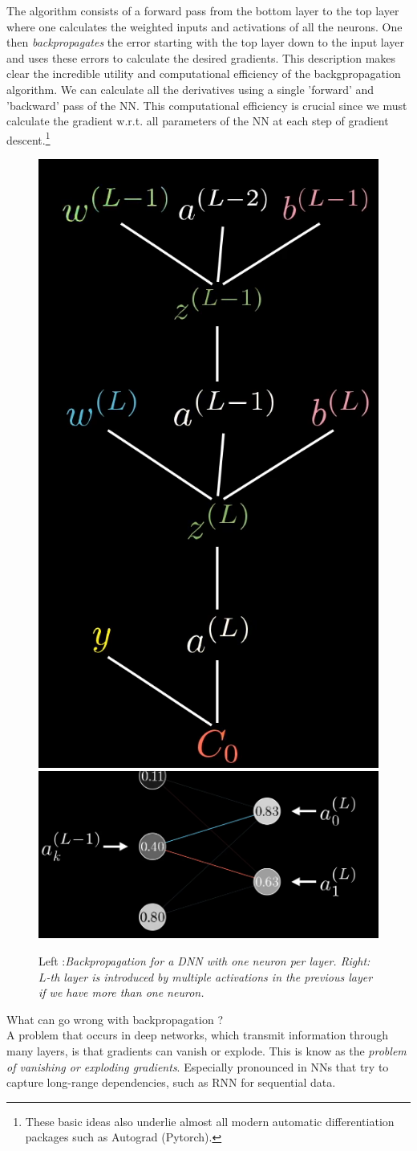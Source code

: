 The algorithm consists of a forward pass from the bottom layer to the top layer where one calculates the weighted inputs and activations of all the neurons. One then \emph{backpropagates} the error starting with the top layer down to the input layer and uses these errors to calculate the desired gradients. This description makes clear the incredible utility and computational efficiency of the backgpropagation algorithm. We can calculate all the derivatives using a single ’forward’ and ’backward’ pass of the NN. This computational efficiency is crucial since we must calculate the gradient w.r.t. all parameters of the NN at each step of gradient descent.\footnote{These basic ideas also underlie almost all modern automatic differentiation packages such as Autograd (Pytorch).}\\
\begin{figure}[h!]
	\centering
	\includegraphics[width=0.3\linewidth]{gfx/Backpropagation}
	\includegraphics[width=0.6\linewidth]{gfx/Backpropagation2}
	\caption{Left :\itshape Backpropagation for a DNN with one neuron per layer. \normalfont Right: \itshape $L$-th layer is introduced by multiple activations in the previous layer if we have more than one neuron.}
	\label{fig:backpropagation}
\end{figure}
What can go wrong with backpropagation ?\\
A problem that occurs in deep networks, which transmit information through many layers, is that gradients can vanish or explode. This is know as the \emph{problem of vanishing or exploding gradients}. Especially pronounced in NNs that try to capture long-range dependencies, such as RNN for sequential data. 
